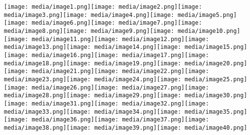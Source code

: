 \documentclass[
]{article}
\author{}
\date{}
\begin{document}
\texttt{[image: media/image1.png]}\texttt{[image: media/image2.png]}\texttt{[image: media/image3.png]}\texttt{[image: media/image4.png]}\texttt{[image: media/image5.png]}\texttt{[image: media/image6.png]}\texttt{[image: media/image7.png]}\texttt{[image: media/image8.png]}\texttt{[image: media/image9.png]}\texttt{[image: media/image10.png]}\texttt{[image: media/image11.png]}\texttt{[image: media/image12.png]}\texttt{[image: media/image13.png]}\texttt{[image: media/image14.png]}\texttt{[image: media/image15.png]}\texttt{[image: media/image16.png]}\texttt{[image: media/image17.png]}\texttt{[image: media/image18.png]}\texttt{[image: media/image19.png]}\texttt{[image: media/image20.png]}\texttt{[image: media/image21.png]}\texttt{[image: media/image22.png]}\texttt{[image: media/image23.png]}\texttt{[image: media/image24.png]}\texttt{[image: media/image25.png]}\texttt{[image: media/image26.png]}\texttt{[image: media/image27.png]}\texttt{[image: media/image28.png]}\texttt{[image: media/image29.png]}\texttt{[image: media/image30.png]}\texttt{[image: media/image31.png]}\texttt{[image: media/image32.png]}\texttt{[image: media/image33.png]}\texttt{[image: media/image34.png]}\texttt{[image: media/image35.png]}\texttt{[image: media/image36.png]}\texttt{[image: media/image37.png]}\texttt{[image: media/image38.png]}\texttt{[image: media/image39.png]}\texttt{[image: media/image40.png]}
\end{document}
